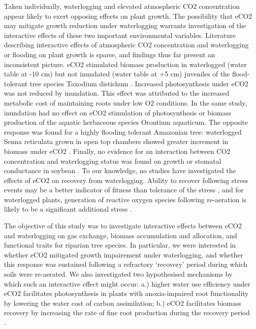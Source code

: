 \documentclass[12pt,a4paper]{memoir}
\begin{document}
Taken individually, waterlogging and elevated atmospheric CO2 concentration appear likely to exert opposing effects on plant growth. The possibility that eCO2 may mitigate growth reduction under waterlogging warrants investigation of the interactive effects of these two important environmental variables. Literature describing interactive effects of atmospheric CO2 concentration and waterlogging or flooding on plant growth is sparse, and findings thus far present an inconsistent picture. eCO2 stimulated biomass production in waterlogged (water table at -10 cm) but not inundated (water table at +5 cm) juveniles of the flood-tolerant tree species Taxodium distichum \citep{Megonigal2005}. Increased photosynthesis under eCO2 was not reduced by inundation. This effect was attributed to the increased metabolic cost of maintaining roots under low O2 conditions. In the same study, inundation had no effect on eCO2 stimulation of photosynthesis or biomass production of the aquatic herbaceous species Orontium aquaticum.  The opposite response was found for a highly flooding tolerant Amazonian tree: waterlogged Senna reticulata grown in open top chambers showed greater increment in biomass under eCO2 \citep{Arenque2014}. Finally, no evidence for an interaction between CO2 concentration and waterlogging status was found on growth or stomatal conductance in soybean \citep{Shimono2012}. To our knowledge, no studies have investigated the effects of eCO2 on recovery from waterlogging. Ability to recover following stress events may be a better indicator of fitness than tolerance of the stress \citep{Gutschick2003}, and for waterlogged plants, generation of reactive oxygen species following re-aeration is likely to be a significant additional stress \citep{Drew1997}. 

The objective of this study was to investigate interactive effects between eCO2 and waterlogging on gas exchange, biomass accumulation and allocation, and functional traits for riparian tree species. In particular, we were interested in whether eCO2 mitigated growth impairement under waterlogging, and whether this response was sustained following a refractory ‘recovery’ period during which soils were re-aerated. We also investigated two hypothesised mechanisms by which such an interactive effect might occur: a.) higher water use efficiency under eCO2 \citep{Holtum2010} facilitates photosynthesis in plants with anoxia-impaired root functionality by lowering the water cost of carbon assimilation; b.) eCO2 facilitates biomass recovery by increasing the rate of fine root production during the recovery period \citep{Pregitzer1995}.  
\end{document}
